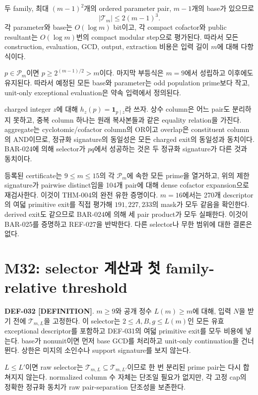 \documentclass[11pt]{article}
\newcommand{\claimstatus}[2]{\textbf{#1 [#2]}}
\begin{document}
두 family, 최대 \((m-1)^2\)개의 ordered parameter pair, \(m-1\)개의
base가 있으므로
\[
|\mathcal T_m|\le2(m-1)^3.
\]
각 parameter와 base는 \(O(\log m)\) bit이고, 각 compact cofactor와
public resultant는 \(O(\log m)\)번의 compact modular step으로
평가된다. 따라서 모든 construction, evaluation, GCD, output,
extraction 비용은 입력 길이 \(m\)에 대해 다항식이다.

\(p\in\mathcal P_m\)이면 \(p\ge2^{(m-1)/2}>m\)이다. 마지막 부등식은
\(m=9\)에서 성립하고 이후에도 유지된다. 따라서 예정된 모든 base와
parameter는 odd population prime보다 작고, unit-only exceptional
evaluation은 약속 입력에서 정의된다.

charged integer \(z\)에 대해
\(h_z(p)=\mathbf1_{p\mid z}\)라 쓰자. 상수 column은 어느 pair도
분리하지 못하고, 중복 column 하나는 원래 복사본들과 같은 equality
relation을 가진다. aggregate는 cyclotomic/cofactor column의 OR이고
overlap은 constituent column의 AND이므로, 정규화 signature의
동일성은 모든 charged exit의 동일성과 동치이다. BAR-024에 의해
selector가 \(pq\)에서 성공하는 것은 두 정규화 signature가 다른
것과 동치이다.

등록된 certificate는 \(9\le m\le15\)의 각 \(\mathcal P_m\)에 속한
모든 prime을 열거하고, 위의 제한 signature가 pairwise distinct임을
104개 pair에 대해 dense cofactor expansion으로 재검사한다. 이것이
THM-004의 완전 유한 증명이다. \(m=16\)에서는 270개 descriptor의
여덟 primitive exit를 직접 평가해 \(191,227,233\)의 mask가 모두
같음을 확인한다. derived exit도 같으므로 BAR-024에 의해 세
pair product가 모두 실패한다. 이것이 BAR-025를 증명하고 REF-027을
반박한다. 다른 selector나 무한 범위에 대한 결론은 없다.

\section{M32: selector 계산과 첫 family-relative threshold}

\claimstatus{DEF-032}{DEFINITION}.
\(m\ge9\)와 공개 정수 \(L(m)\ge m\)에 대해, 입력 \(N\)을 받기 전에
\(\mathcal T_{m,L}\)을 고정한다. 이 selector는
\(2\le A,B,g\le L(m)\)인 모든 유효 exceptional descriptor를
포함하고 DEF-031의 여덟 primitive exit를 모두 비용에 넣는다.
base가 nonunit이면 먼저 base GCD를 처리하고 unit-only continuation을
건너뛴다. 상한은 미지의 소인수나 support signature를 보지 않는다.

\(L\le L'\)이면 raw selector는
\(\mathcal T_{m,L}\subseteq\mathcal T_{m,L'}\)이므로 한 번 분리된
prime pair는 다시 합쳐지지 않는다. normalized column 수 자체는
단조일 필요가 없지만, 각 고정 cap의 정확한 정규화 동치가 raw
pair-separation 단조성을 보존한다.
\end{document}
